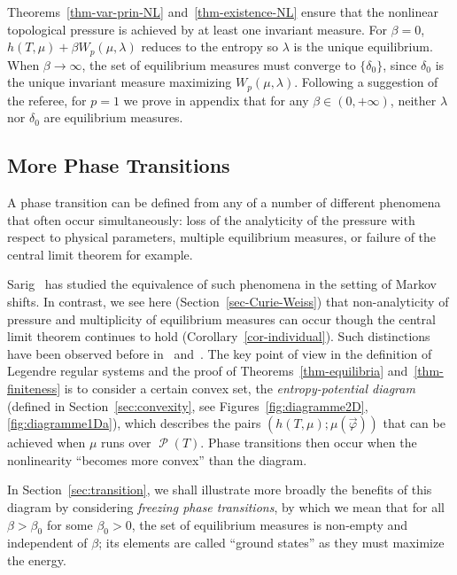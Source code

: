\documentclass[10pt]{amsart}
\theoremstyle{definition}\newtheorem{defi}[theo]{Definition}\newtheorem{rema}[theo]{Remark}\newtheorem{exam}[theo]{Example}\newtheorem{exem}[theo]{Example}\newtheorem{nota}[theo]{Notation}
\theoremstyle{plain}
\theoremstyle{plain}
\newcommand\Prob{{\operatorname{\mathscr{P}}}}
\newcommand{\pot}{\varphi}
\newcounter{In}
\newcommand*\8{\infty}
\begin{document}
Theorems~\ref{thm-var-prin-NL} and~\ref{thm-existence-NL} ensure that the nonlinear topological pressure is achieved by at least one invariant measure. For $\beta=0$, $h(T,\mu)+\beta W_p(\mu,\lambda)$ reduces to the entropy so $\lambda$ is the unique equilibrium. When $\beta\to\infty$, the set of equilibrium measures must converge to $\{\delta_0\}$, since $\delta_0$ is the unique invariant measure maximizing $W_p(\mu,\lambda)$. Following a suggestion of the referee, for $p=1$ we prove in appendix that for any $\beta\in(0,+\infty)$, neither $\lambda$ nor $\delta_0$ are equilibrium measures.



\subsection{More Phase Transitions}\label{subsec-comments}
A phase transition can be defined from any of a number of different phenomena that often { occur simultaneously}: loss of the analyticity of the pressure with respect to physical parameters, multiple equilibrium measures, or failure of the central limit theorem for example.

Sarig~\cite{Sarig-2001-PhaseTransitions} has studied the equivalence of such phenomena in the setting of Markov shifts. In contrast, we see here (Section~\ref{sec-Curie-Weiss}) that non-analyticity of pressure and multiplicity of equilibrium measures can occur though the central limit theorem continues to hold (Corollary~\ref{cor-individual}). Such distinctions have been observed before in~\cite{leplaideur-butterfly} and~\cite{thaler}. The key point of view in the definition of Legendre regular systems and the proof of Theorems~\ref{thm-equilibria} and~\ref{thm-finiteness} is to consider a certain convex set, the \emph{entropy-potential diagram} (defined in Section~\ref{sec:convexity}, see Figures~\ref{fig:diagramme2D}, \ref{fig:diagramme1Da}), which describes the pairs $(h(T,\mu);\mu(\vec\pot))$ that can be achieved when $\mu$ runs over $\Prob(T)$. Phase transitions then occur when the nonlinearity ``becomes more convex'' than the diagram.

In Section~\ref{sec:transition}, we shall illustrate more broadly the benefits of this diagram by considering \emph{freezing phase transitions}, by which we mean that for all $\beta>\beta_0$ for some $\beta_0>0$, the set of equilibrium measures is non-empty and independent of $\beta$; its elements are called ``ground states'' as they must maximize the energy.
\end{document}
